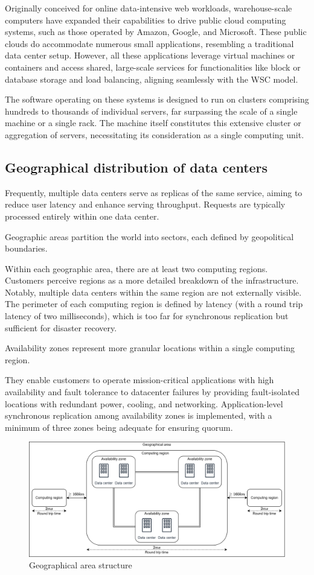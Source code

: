Originally conceived for online data-intensive web workloads, warehouse-scale computers have expanded their capabilities to drive public cloud computing systems, such as those operated by Amazon, Google, and Microsoft. 
These public clouds do accommodate numerous small applications, resembling a traditional data center setup. 
However, all these applications leverage virtual machines or containers and access shared, large-scale services for functionalities like block or database storage and load balancing, aligning seamlessly with the WSC model.

The software operating on these systems is designed to run on clusters comprising hundreds to thousands of individual servers, far surpassing the scale of a single machine or a single rack. 
The machine itself constitutes this extensive cluster or aggregation of servers, necessitating its consideration as a single computing unit.

\subsection{Geographical distribution of data centers}
Frequently, multiple data centers serve as replicas of the same service, aiming to reduce user latency and enhance serving throughput. 
Requests are typically processed entirely within one data center.

\begin{definition}
    Geographic areas partition the world into sectors, each defined by geopolitical boundaries. 
\end{definition}

Within each geographic area, there are at least two computing regions.
Customers perceive regions as a more detailed breakdown of the infrastructure. 
Notably, multiple data centers within the same region are not externally visible. 
The perimeter of each computing region is defined by latency (with a round trip latency of two milliseconds), which is too far for synchronous replication but sufficient for disaster recovery.

\begin{definition}
    Availability zones represent more granular locations within a single computing region.
\end{definition}

They enable customers to operate mission-critical applications with high availability and fault tolerance to datacenter failures by providing fault-isolated locations with redundant power, cooling, and networking.
Application-level synchronous replication among availability zones is implemented, with a minimum of three zones being adequate for ensuring quorum.

\begin{figure}[H]
    \centering
    \includegraphics[width=1\linewidth]{images/computing.png}
    \caption{Geographical area structure}
\end{figure}